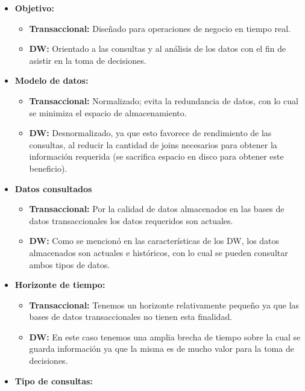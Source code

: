 \documentclass[a4paper,11pt]{article}
\begin{document}
    
    \begin{itemize}
      \item \textbf{Objetivo:} 
        \begin{itemize}
          \item \textbf{Transaccional:} Diseñado para operaciones de negocio en tiempo real.
          \item \textbf{DW:} Orientado a las consultas y al análisis de los datos con el fin de asistir en la toma de decisiones. 
        \end{itemize}
      \item \textbf{Modelo de datos:}
        \begin{itemize}
          \item \textbf{Transaccional:} Normalizado; evita la redundancia de datos, con lo cual se minimiza el espacio de almacenamiento.
          \item \textbf{DW:} Desnormalizado, ya que esto favorece de rendimiento de las consultas, al reducir la cantidad de joins necesarios
          para obtener la información requerida (se sacrifica espacio en disco para obtener este beneficio).
        \end{itemize}
      \item \textbf{Datos consultados}
        \begin{itemize}
          \item \textbf{Transaccional:} Por la calidad de datos almacenados en las bases de datos transaccionales los datos requeridos son actuales.
          \item \textbf{DW:} Como se mencionó en las características de los DW, los datos almacenados son actuales e históricos, con lo cual se pueden
          consultar ambos tipos de datos.
        \end{itemize}
      \item \textbf{Horizonte de tiempo:}
        \begin{itemize}
          \item \textbf{Transaccional:} Tenemos un horizonte relativamente pequeño ya que las bases de datos transaccionales no tienen esta finalidad.
          \item \textbf{DW:} En este caso tenemos una amplia brecha de tiempo sobre la cual se guarda información ya que la misma es de mucho valor para
          la toma de decisiones.
        \end{itemize}
      \item \textbf{Tipo de consultas:}
        \begin{itemize}

\end{itemize}
\end{itemize}
\end{document}
